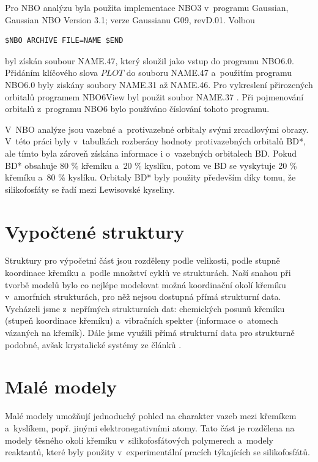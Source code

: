 \documentclass[
digital, %
table,   %
nolof,     %
nolot,     %
oneside,
]{fithesis3}
\begin{document}
Pro NBO analýzu byla použita implementace NBO3 v~programu Gaussian, Gaussian NBO Version 3.1; verze Gaussianu G09, revD.01. Volbou \begin{lstlisting}[frame=single]
$NBO ARCHIVE FILE=NAME $END
\end{lstlisting}
byl získán soubour NAME.47, který sloužil jako vstup do programu NBO6.0. Přidáním klíčového slova $PLOT$ do souboru NAME.47 a~použitím programu NBO6.0 byly ziskány soubory NAME.31 až NAME.46. Pro vykreslení přirozených orbitalů programem NBO6View byl použit soubor NAME.37 \cite{doi:10.1002/jcc.23266}. Při pojmenování orbitalů z~programu NBO6 bylo používáno číslování tohoto programu.

V~NBO analýze jsou vazebné a~protivazebné orbitaly svými zrcadlovými obrazy. V~této práci byly v~tabulkách rozberány hodnoty protivazebných orbitalů BD*, ale tímto byla zároveň získána informace i o~vazebných orbitalech BD. Pokud BD* obsahuje 80 \% křemíku a~20 \% kyslíku, potom ve BD se vyskytuje 20 \% křemíku a~80 \% kyslíku. Orbitaly BD* byly použity především díky tomu, že silikofosfáty se řadí mezi Lewisovské kyseliny.

\section{Vypočtené struktury}\label{vypoctene_struktury}
Struktury pro výpočetní část jsou rozděleny podle velikosti, podle stupně koordinace křemíku a~podle množství cyklů ve strukturách. Naší snahou při tvorbě modelů bylo co nejlépe modelovat možná koordinační okolí křemíku v~amorfních strukturách, pro něž nejsou dostupná přímá strukturní data. Vycházeli jsme z~nepřímých strukturních dat: chemických posunů křemíku (stupeň koordinace křemíku) a~vibračních spekter (informace o~atomech vázaných na křemík). Dále jsme využili přímá strukturní data pro strukturně podobné, avšak krystalické systémy ze článků \cite{C3NJ00721A, rtg_4_pinkas}.

\section{Malé modely}
Malé modely umožňují jednoduchý pohled na charakter vazeb mezi křemíkem a~kyslíkem, popř. jinými elektronegativními atomy. Tato část je rozdělena na modely těsného okolí křemíku v~silikofosfátových polymerech a~modely reaktantů, které byly použity v~experimentální pracích týkajících se silikofosfátů.
\end{document}
